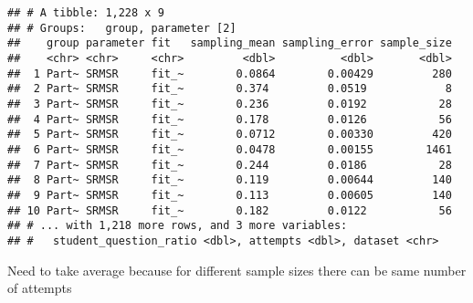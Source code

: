 \documentclass[]{article}
\newenvironment{Shaded}{\begin{snugshade}}{\end{snugshade}}
\newcommand{\DataTypeTok}[1]{\textcolor[rgb]{0.13,0.29,0.53}{#1}}
\newcommand{\KeywordTok}[1]{\textcolor[rgb]{0.13,0.29,0.53}{\textbf{#1}}}
\newcommand{\NormalTok}[1]{#1}
\newcommand{\OperatorTok}[1]{\textcolor[rgb]{0.81,0.36,0.00}{\textbf{#1}}}
\newcommand{\StringTok}[1]{\textcolor[rgb]{0.31,0.60,0.02}{#1}}
\begin{document}
\begin{Shaded}
\end{Shaded}

\begin{verbatim}
## # A tibble: 1,228 x 9
## # Groups:   group, parameter [2]
##    group parameter fit   sampling_mean sampling_error sample_size
##    <chr> <chr>     <chr>         <dbl>          <dbl>       <dbl>
##  1 Part~ SRMSR     fit_~        0.0864        0.00429         280
##  2 Part~ SRMSR     fit_~        0.374         0.0519            8
##  3 Part~ SRMSR     fit_~        0.236         0.0192           28
##  4 Part~ SRMSR     fit_~        0.178         0.0126           56
##  5 Part~ SRMSR     fit_~        0.0712        0.00330         420
##  6 Part~ SRMSR     fit_~        0.0478        0.00155        1461
##  7 Part~ SRMSR     fit_~        0.244         0.0186           28
##  8 Part~ SRMSR     fit_~        0.119         0.00644         140
##  9 Part~ SRMSR     fit_~        0.113         0.00605         140
## 10 Part~ SRMSR     fit_~        0.182         0.0122           56
## # ... with 1,218 more rows, and 3 more variables:
## #   student_question_ratio <dbl>, attempts <dbl>, dataset <chr>
\end{verbatim}

Need to take average because for different sample sizes there can be
same number of attempts

\begin{Shaded}
\end{Shaded}
\end{document}
